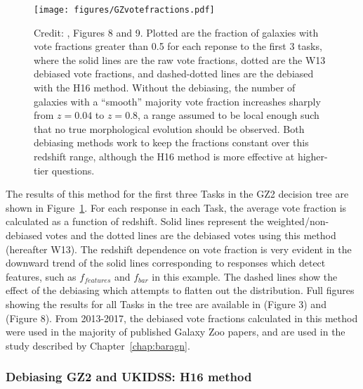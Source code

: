 \begin{figure}
\centering
\texttt{[image: figures/GZvotefractions.pdf]}
\caption{Credit: \citet{Hart2016}, Figures 8 and 9. Plotted are the fraction of galaxies with vote fractions greater than 0.5 for each reponse to the first 3 tasks, where the solid lines are the raw vote fractions, dotted are the W13 debiased vote fractions, and dashed-dotted lines are the debiased with the H16 method. Without the debiasing, the number of galaxies with a ``smooth'' majority vote fraction increashes sharply from $z=0.04$ to $z=0.8$, a range assumed to be local enough such that no true morphological evolution should be observed. Both debiasing methods work to keep the fractions constant over this redshift range, although the H16 method is more effective at higher-tier questions.}
\label{fig:gz2debiasingresults}
\end{figure}

The results of this method for the first three Tasks in the GZ2 decision tree are shown in Figure~\ref{fig:gz2debiasingresults}. For each response in each Task, the average vote fraction is calculated as a function of redshift. Solid lines represent the weighted/non-debiased votes and the dotted lines are the debiased votes using this method (hereafter W13).
The redshift dependence on vote fraction is very evident in the downward trend of the solid lines corresponding to responses which detect features, such as $f_{features}$ and $f_{bar}$ in this example. The dashed lines show the effect of the debiasing which attempts to flatten out the distribution. Full figures showing the results for all Tasks in the tree are available in \citet{Willett2013} (Figure 3) and \citet{Hart2016} (Figure 8). From 2013-2017, the debiased vote fractions calculated in this method were used in the majority of published Galaxy Zoo papers, and are used in the study described by Chapter~\ref{chap:baragn}. 


\subsubsection{Debiasing GZ2 and UKIDSS: H16 method}

